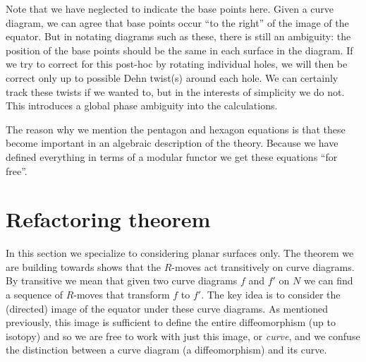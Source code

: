 Note that we have neglected to indicate the base points here.
Given a curve diagram, we can agree that base points
occur ``to the right'' of the image of the equator.
But in notating diagrams such as these, there is still
an ambiguity: the position of the base points should be the
same in each surface in the diagram.
If we try to correct for this post-hoc
by rotating individual holes,
we will then be correct
only up to possible Dehn twist(s) around each hole.
We can certainly track these twists if we wanted to,
but in the interests of simplicity we do not.
This introduces a global phase ambiguity into the
calculations.


The reason why we mention the pentagon and hexagon
equations is that these become important in an
algebraic description of the theory.
Because we have defined everything in terms of
a modular functor we get these equations ``for free''.



%
%

\section{Refactoring theorem}\label{RefactoringTheorem}
In this section we specialize to considering planar surfaces only.
The theorem we are building towards shows that
the $R$-moves act transitively
on curve diagrams.
By transitive we mean that
given two curve diagrams $f$ and $f'$ on $N$ we can find
a sequence of $R$-moves that transform $f$ to $f'.$
The key idea is to consider the (directed) image of the equator under
these curve diagrams.
As mentioned previously, this image is sufficient to
define the entire diffeomorphism (up to isotopy) and so we are free
to work with just this image, or \emph{curve},
and we confuse the distinction between 
a curve diagram (a diffeomorphism)
and its curve.

